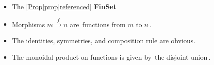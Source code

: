 
\begin{itemize}
    \item The \ref{Prop|prop|referenced} \textbf{FinSet}
    \item Morphisms $m \xrightarrow f n$ are \,functions from $\bar m$ to $\bar n$\,.
    \item The identities, symmetries, and composition rule are obvious.
    \item The monoidal product on functions is given by \,the disjoint union\,.
  \end{itemize}
